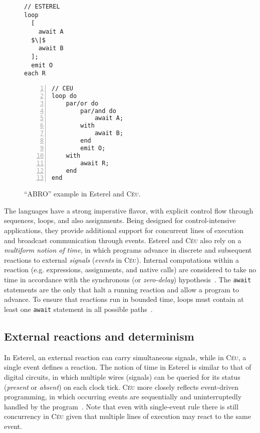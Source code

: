 \documentclass{acm_proc_article-sp}
\newcommand{\CEU}{\textsc{C\'{e}u}\xspace}
\newcommand{\code}[1] {{\small{\texttt{#1}}}}
\newcommand{\1}{\;}
\newcommand{\2}{\;\;}
\newcommand{\3}{\;\;\;}
\newcommand{\5}{\;\;\;\;\;}
\begin{document}
\begin{figure}[t]
\begin{minipage}[t]{0.40\linewidth}
\begin{lstlisting}[mathescape=true]
// ESTEREL
loop
  [
    await A
  $\|$
    await B
  ];
  emit O
each R
\end{lstlisting}
\end{minipage}
%
\begin{minipage}[t]{0.55\linewidth}
\begin{lstlisting}[numbers=left,xleftmargin=2.5em]
// CEU
loop do
    par/or do
        par/and do
            await A;
        with
            await B;
        end
        emit O;
    with
        await R;
    end
end
\end{lstlisting}
\end{minipage}
\caption{ ``ABRO'' example in Esterel and \CEU. %
{\small
}
\label{lst.abro}
}
\end{figure}

The languages have a strong imperative flavor, with explicit control flow 
through sequences, loops, and also assignments.
Being designed for control-intensive applications, they provide additional 
support for concurrent lines of execution and broadcast communication through 
events.
%
Esterel and \CEU also rely on a \emph{multiform notion of time}, in which 
programs advance in discrete and subsequent reactions to external 
\emph{signals} (\emph{events} in \CEU).
Internal computations within a reaction (e.g. expressions, assignments, and 
native calls) are considered to take no time in accordance with the synchronous 
(or \emph{zero-delay}) hypothesis~\cite{rp.hypothesis}.
The \code{await} statements are the only that halt a running reaction and allow 
a program to advance.
%
To ensure that reactions run in bounded time, loops must contain at least one 
\code{await} statement in all possible paths~\cite{ceu.sensys,esterel.primer}.

\subsection{External reactions and determinism}

In Esterel, an external reaction can carry simultaneous signals, while in \CEU, 
a single event defines a reaction.
%
The notion of time in Esterel is similar to that of digital circuits, in which 
multiple wires (signals) can be queried for its status (\emph{present} or 
\emph{absent}) on each clock tick.
%
\CEU more closely reflects event-driven programming, in which occurring events 
are sequentially and uninterruptedly handled by the program~\cite{EVT1,EVT2}.
%
Note that even with single-event rule there is still concurrency in \CEU given 
that multiple lines of execution may react to the same event.
\end{document}
